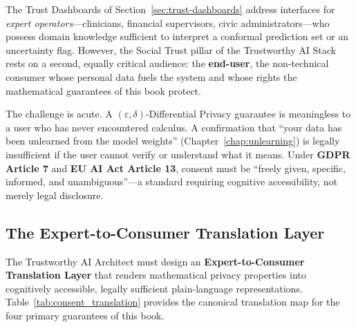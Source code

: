 The Trust Dashboards of Section~\ref{sec:trust-dashboards} address interfaces for \emph{expert operators}---clinicians, financial supervisors, civic administrators---who possess domain knowledge sufficient to interpret a conformal prediction set or an uncertainty flag. However, the Social Trust pillar of the Trustworthy AI Stack rests on a second, equally critical audience: the \textbf{end-user}, the non-technical consumer whose personal data fuels the system and whose rights the mathematical guarantees of this book protect.

The challenge is acute. A $(\varepsilon, \delta)$-Differential Privacy guarantee is meaningless to a user who has never encountered calculus. A confirmation that ``your data has been unlearned from the model weights'' (Chapter~\ref{chap:unlearning}) is legally insufficient if the user cannot verify or understand what it means. Under \textbf{GDPR Article 7} and \textbf{EU AI Act Article 13}, consent must be ``freely given, specific, informed, and unambiguous''---a standard requiring cognitive accessibility, not merely legal disclosure.

\subsection{The Expert-to-Consumer Translation Layer}
\label{sec:translation_layer}

The Trustworthy AI Architect must design an \textbf{Expert-to-Consumer Translation Layer} that renders mathematical privacy properties into cognitively accessible, legally sufficient plain-language representations. Table~\ref{tab:consent_translation} provides the canonical translation map for the four primary guarantees of this book.

